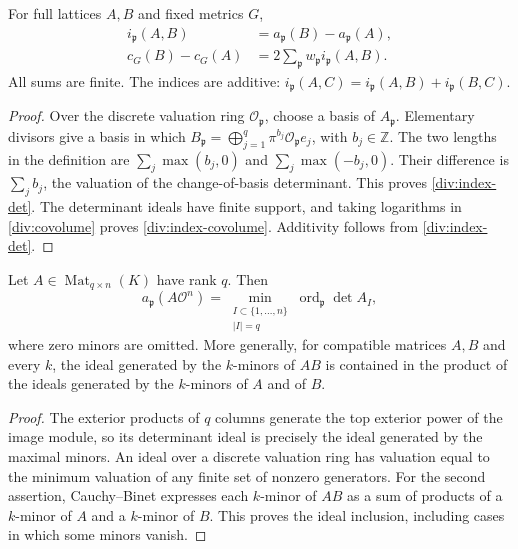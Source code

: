 \begin{lemma}\label{div:index}
For full lattices $A,B$ and fixed metrics $G$,
\begin{align}
 i_{\mathfrak p}(A,B)&=a_{\mathfrak p}(B)-a_{\mathfrak p}(A),
       \label{div:index-det}\\
 c_G(B)-c_G(A)&=2\sum_{\mathfrak p}w_{\mathfrak p}
                                  i_{\mathfrak p}(A,B).
       \label{div:index-covolume}
\end{align}
All sums are finite. The indices are additive:
$i_{\mathfrak p}(A,C)=i_{\mathfrak p}(A,B)+i_{\mathfrak p}(B,C)$.
\end{lemma}
\begin{proof}
Over the discrete valuation ring $\mathcal O_{\mathfrak p}$, choose a
basis of $A_{\mathfrak p}$. Elementary divisors give a basis in which
$B_{\mathfrak p}=\bigoplus_{j=1}^q\pi^{b_j}\mathcal O_{\mathfrak p}e_j$,
with $b_j\in\mathbb Z$. The two lengths in the definition are
$\sum_j\max(b_j,0)$ and $\sum_j\max(-b_j,0)$. Their difference is
$\sum_jb_j$, the valuation of the change-of-basis determinant. This
proves \eqref{div:index-det}. The determinant ideals have finite support,
and taking logarithms in \eqref{div:covolume} proves
\eqref{div:index-covolume}. Additivity follows from
\eqref{div:index-det}.
\end{proof}

\begin{lemma}\label{div:minors}
Let $A\in\operatorname{Mat}_{q\times n}(K)$ have rank $q$. Then
\[
 a_{\mathfrak p}(A\mathcal O^n)
 =\min_{\substack{I\subset\{1,\ldots,n\}\\|I|=q}}
           \operatorname{ord}_{\mathfrak p}\det A_I,
\]
where zero minors are omitted. More generally, for compatible matrices
$A,B$ and every $k$, the ideal generated by the $k$-minors of $AB$ is
contained in the product of the ideals generated by the $k$-minors of
$A$ and of $B$.
\end{lemma}
\begin{proof}
The exterior products of $q$ columns generate the top exterior power of
the image module, so its determinant ideal is precisely the ideal
generated by the maximal minors. An ideal over a discrete valuation
ring has valuation equal to the minimum valuation of any finite set of
nonzero generators. For the second assertion, Cauchy--Binet expresses
each $k$-minor of $AB$ as a sum of products of a $k$-minor of $A$ and a
$k$-minor of $B$. This proves the ideal inclusion, including cases in
which some minors vanish.
\end{proof}

